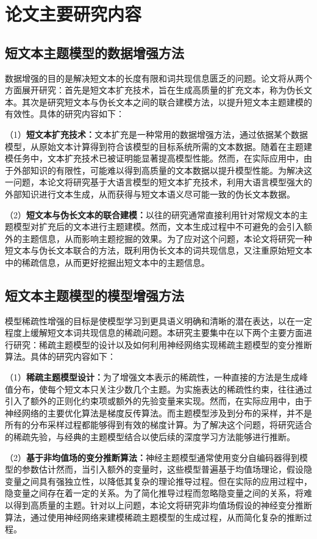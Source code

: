 \section{论文主要研究内容}
\subsection{短文本主题模型的数据增强方法}
数据增强的目的是解决短文本的长度有限和词共现信息匮乏的问题。论文将从两个方面展开研究：首先是短文本扩充技术，旨在生成高质量的扩充文本，称为伪长文本。其次是研究短文本与伪长文本之间的联合建模方法，以提升短文本主题建模的有效性。具体的研究内容如下：

（1）\textbf{短文本扩充技术：}文本扩充是一种常用的数据增强方法，通过依据某个数据模型，从原始文本计算得到符合该模型的目标系统所需的文本数据。随着在主题建模任务中，文本扩充技术已被证明能显著提高模型性能。然而，在实际应用中，由于外部知识的有限性，可能难以得到高质量的文本数据以提升模型性能。为解决这一问题，本论文将研究基于大语言模型的短文本扩充技术，利用大语言模型强大的外部知识进行文本生成，从而获得与短文本语义尽可能一致的伪长文本数据。

（2）\textbf{短文本与伪长文本的联合建模：}以往的研究通常直接利用针对常规文本的主题模型对扩充后的文本进行主题建模。然而，文本生成过程中不可避免的会引入额外的主题信息，从而影响主题挖掘的效果。为了应对这个问题，本论文将研究一种短文本与伪长文本联合的方法，既利用伪长文本的词共现信息，又注重原始短文本中的稀疏信息，从而更好挖掘出短文本中的主题信息。


\subsection{短文本主题模型的模型增强方法}
模型稀疏性增强的目标是使模型学习到更具语义明确和清晰的潜在表达，以在一定程度上缓解短文本词共现信息的稀疏问题。本研究主要集中在以下两个主要方面进行研究：稀疏主题模型的设计以及如何利用神经网络实现稀疏主题模型的变分推断算法。具体的研究内容如下：

（1）\textbf{稀疏主题模型设计：}为了增强文本表示的稀疏性，一种直接的方法是生成峰值分布，使每个短文本只关注少数几个主题。为实施表达的稀疏性约束，往往通过引入了额外的正则化约束项或额外的先验变量来实现。然而，在实际应用中，由于神经网络的主要优化算法是梯度反传算法。而主题模型涉及到分布的采样，并不是所有的分布采样过程都能够得到有效的梯度计算。为了解决这个问题，将研究适合的稀疏先验，与经典的主题模型结合以使后续的深度学习方法能够进行推断。

（2）\textbf{基于非均值场的变分推断算法：}神经主题模型通常使用变分自编码器得到模型的参数估计然而，当引入额外的变量时，这些模型普遍基于均值场理论，假设隐变量之间具有强独立性，以降低其复杂的理论推导过程。但在实际的应用过程中，隐变量之间存在着一定的关系。为了简化推导过程而忽略隐变量之间的关系，将难以得到高质量的主题。针对以上问题，本论文将研究非均值场假设的神经变分推断算法，通过使用神经网络来建模稀疏主题模型的生成过程，从而简化复杂的推断过程。

